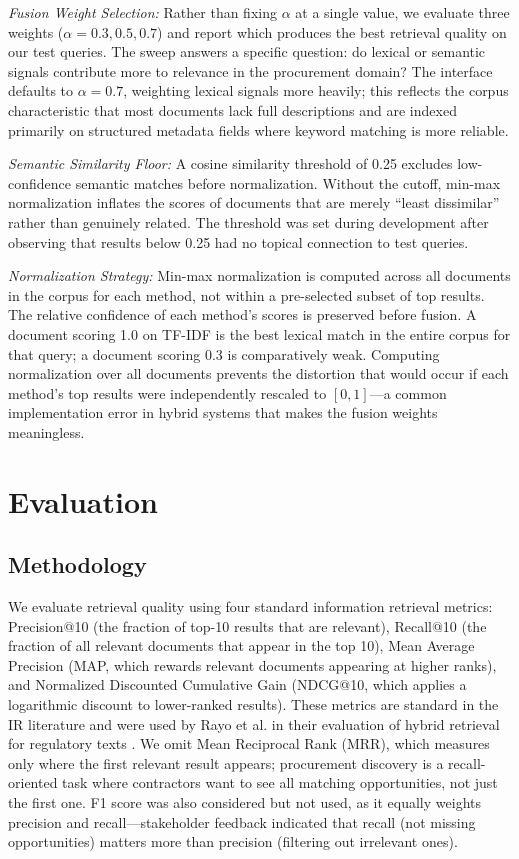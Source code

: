 \documentclass[10pt,twocolumn]{article}
\begin{document}
\textit{Fusion Weight Selection:} Rather than fixing $\alpha$ at a single value, we evaluate three weights ($\alpha = 0.3, 0.5, 0.7$) and report which produces the best retrieval quality on our test queries. The sweep answers a specific question: do lexical or semantic signals contribute more to relevance in the procurement domain? The interface defaults to $\alpha = 0.7$, weighting lexical signals more heavily; this reflects the corpus characteristic that most documents lack full descriptions and are indexed primarily on structured metadata fields where keyword matching is more reliable.

\textit{Semantic Similarity Floor:} A cosine similarity threshold of 0.25 excludes low-confidence semantic matches before normalization. Without the cutoff, min-max normalization inflates the scores of documents that are merely ``least dissimilar'' rather than genuinely related. The threshold was set during development after observing that results below 0.25 had no topical connection to test queries.

\textit{Normalization Strategy:} Min-max normalization is computed across all documents in the corpus for each method, not within a pre-selected subset of top results. The relative confidence of each method's scores is preserved before fusion. A document scoring 1.0 on TF-IDF is the best lexical match in the entire corpus for that query; a document scoring 0.3 is comparatively weak. Computing normalization over all documents prevents the distortion that would occur if each method's top results were independently rescaled to $[0,1]$---a common implementation error in hybrid systems that makes the fusion weights meaningless.

\section{Evaluation}

\subsection{Methodology}

We evaluate retrieval quality using four standard information retrieval metrics: Precision@10 (the fraction of top-10 results that are relevant), Recall@10 (the fraction of all relevant documents that appear in the top 10), Mean Average Precision (MAP, which rewards relevant documents appearing at higher ranks), and Normalized Discounted Cumulative Gain (NDCG@10, which applies a logarithmic discount to lower-ranked results). These metrics are standard in the IR literature and were used by Rayo et al. in their evaluation of hybrid retrieval for regulatory texts \cite{Rayo2025}. We omit Mean Reciprocal Rank (MRR), which measures only where the first relevant result appears; procurement discovery is a recall-oriented task where contractors want to see all matching opportunities, not just the first one. F1 score was also considered but not used, as it equally weights precision and recall---stakeholder feedback indicated that recall (not missing opportunities) matters more than precision (filtering out irrelevant ones).
\end{document}
